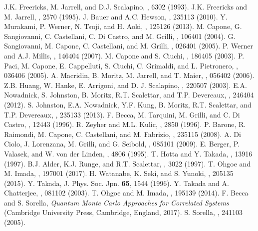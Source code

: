 \documentclass[aps,superscriptaddress,amsmath,amssymb,twocolumn,showpacs,floatfix,english]{revtex4}
\begin{document}
\begin{thebibliography}{99}
 J.K. Freericks, M. Jarrell, and D.J. Scalapino, , 6302 (1993).
 J.K. Freericks and M. Jarrell, , 2570 (1995).
 J. Bauer and A.C. Hewson, , 235113 (2010).
 Y. Murakami, P. Werner, N. Tsuji, and H. Aoki, , 125126 (2013).
 M. Capone, G. Sangiovanni, C. Castellani, C. Di Castro, and M. Grilli, , 106401 (2004).
 G. Sangiovanni, M. Capone, C. Castellani, and M. Grilli, , 026401 (2005).
 P. Werner and A.J. Millis, , 146404 (2007).
 M. Capone and S. Ciuchi, , 186405 (2003).
 P. Paci, M. Capone, E. Cappelluti, S. Ciuchi, C. Grimaldi, and L. Pietronero, , 036406 (2005).
 A. Macridin, B. Moritz, M. Jarrell, and T. Maier, , 056402 (2006). 
 Z.B. Huang, W. Hanke, E. Arrigoni, and D. J. Scalapino, , 220507 (2003).
 E.A. Nowadnick, S. Johnston, B. Moritz, R.T. Scalettar, and T.P. Devereaux, , 246404 (2012).
 S. Johnston, E.A. Nowadnick, Y.F. Kung, B. Moritz, R.T. Scalettar, and T.P. Devereaux, , 235133
   (2013).
 F. Becca, M. Tarquini, M. Grilli, and C. Di Castro, , 12443 (1996).
 R. Zeyher and M.L. Kulic, , 2850 (1996).
 P. Barone, R. Raimondi, M. Capone, C. Castellani, and M. Fabrizio, , 235115 (2008).
 A. Di Ciolo, J. Lorenzana, M. Grilli, and G. Seibold, , 085101 (2009).
 E. Berger, P. Valasek, and W. von der Linden, , 4806 (1995).
 T. Hotta and Y. Takada, , 13916 (1997).
 B.J. Alder, K.J. Runge, and R.T. Scalettar, , 3022 (1997).
 T. Ohgoe and M. Imada, , 197001 (2017).
 H. Watanabe, K. Seki, and S. Yunoki, , 205135 (2015).
 Y. Takada, J. Phys. Soc. Jpn. {\bf 65}, 1544 (1996).
 Y. Takada and A. Chatterjee, , 081102 (2003).
 T. Ohgoe and M. Imada, , 195139 (2014).
 F. Becca and S. Sorella, {\it Quantum Monte Carlo Approaches for Correlated Systems} (Cambridge University Press, 
Cambridge, England, 2017).
 S. Sorella, , 241103 (2005).

\end{thebibliography}
\end{document}
